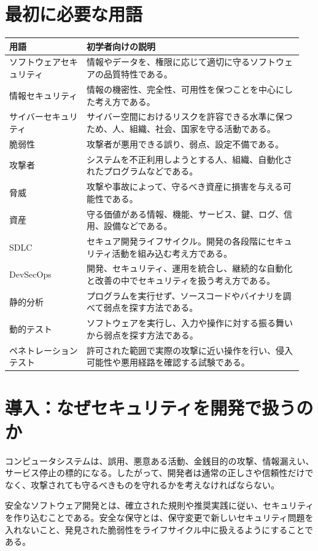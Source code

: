 \documentclass[uplatex,dvipdfmx,a4paper,11pt]{jsarticle}
\begin{document}
\section{最初に必要な用語}
\begin{longtable}{>{\raggedright\arraybackslash}p{0.25\linewidth}>{\raggedright\arraybackslash}p{0.7\linewidth}}
\toprule
\textbf{用語} & \textbf{初学者向けの説明} \\
\midrule
\endhead
ソフトウェアセキュリティ & 情報やデータを、権限に応じて適切に守るソフトウェアの品質特性である。 \\
情報セキュリティ & 情報の機密性、完全性、可用性を保つことを中心にした考え方である。 \\
サイバーセキュリティ & サイバー空間におけるリスクを許容できる水準に保つため、人、組織、社会、国家を守る活動である。 \\
脆弱性 & 攻撃者が悪用できる誤り、弱点、設定不備である。 \\
攻撃者 & システムを不正利用しようとする人、組織、自動化されたプログラムなどである。 \\
脅威 & 攻撃や事故によって、守るべき資産に損害を与える可能性である。 \\
資産 & 守る価値がある情報、機能、サービス、鍵、ログ、信用、設備などである。 \\
SDLC & セキュア開発ライフサイクル。開発の各段階にセキュリティ活動を組み込む考え方である。 \\
DevSecOps & 開発、セキュリティ、運用を統合し、継続的な自動化と改善の中でセキュリティを扱う考え方である。 \\
静的分析 & プログラムを実行せず、ソースコードやバイナリを調べて弱点を探す方法である。 \\
動的テスト & ソフトウェアを実行し、入力や操作に対する振る舞いから弱点を探す方法である。 \\
ペネトレーションテスト & 許可された範囲で実際の攻撃に近い操作を行い、侵入可能性や悪用経路を確認する試験である。 \\
\bottomrule
\end{longtable}
\section{導入：なぜセキュリティを開発で扱うのか}
コンピュータシステムは、誤用、悪意ある活動、金銭目的の攻撃、情報漏えい、サービス停止の標的になる。したがって、開発者は通常の正しさや信頼性だけでなく、攻撃されても守るべきものを守れるかを考えなければならない。

安全なソフトウェア開発とは、確立された規則や推奨実践に従い、セキュリティを作り込むことである。安全な保守とは、保守変更で新しいセキュリティ問題を入れないこと、発見された脆弱性をライフサイクル中に扱えるようにすることである。
\end{document}
